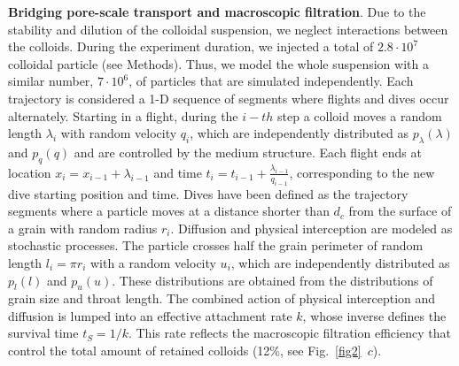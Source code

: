 \documentclass[singlecolumn,pre,notitlepage,preprintnumbers,floatfix,superscriptaddress]{revtex4-1}
\begin{document}
\noindent
\textbf{Bridging pore-scale transport and macroscopic filtration}. Due to the stability and dilution of the colloidal suspension, we neglect interactions between the colloids. During the experiment duration, we injected a total of $2.8 \cdot 10^7$ colloidal particle (see Methods). Thus, we model the whole suspension with a similar number, $7 \cdot 10^6$, of particles that are simulated independently. Each trajectory is considered a 1-D sequence of segments where flights and dives occur alternately. Starting in a flight, during the $i-th$ step a colloid moves a random length $\lambda_i$ with random velocity $q_i$, which are independently distributed as $p_\lambda(\lambda)$ and $p_q(q)$ and are controlled by the medium structure. Each flight ends at location $x_i = x_{i-1} + \lambda_{i-1}$ and time $t_i = t_{i-1} + \frac{\lambda_{i-1}}{q_{i-1}}$, corresponding to the new dive starting position and time. Dives have been defined as the trajectory segments where a particle moves at a distance shorter than $d_c$ from the surface of a grain with random radius $r_i$. Diffusion and physical interception are modeled as stochastic processes. The particle crosses half the grain perimeter of random length $l_i = \pi r_i$ with a random velocity $u_i$, which are independently distributed as $p_l(l)$ and $p_u(u)$. These distributions are obtained from the distributions of grain size and throat length. The combined action of physical interception and diffusion is lumped into an effective attachment rate $k$, whose inverse defines the survival time $t_S = 1/k$. This rate reflects the macroscopic filtration efficiency that control the total amount of retained colloids (12\%, see Fig.~\ref{fig2}~$c$). \\
\end{document}
